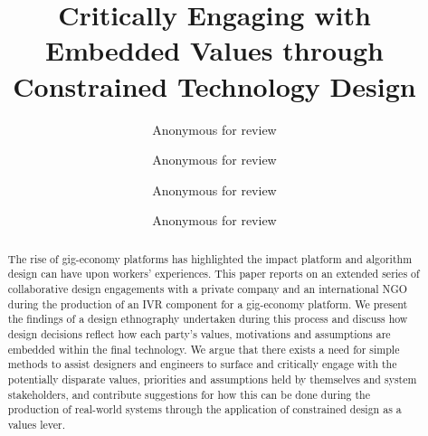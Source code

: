 \documentclass[sigconf,anonymous]{acmart}
\begin{document}
\title{Critically Engaging with Embedded Values through Constrained Technology Design}

\author{Anonymous for review}

\author{Anonymous for review}

\author{Anonymous for review}

\author{Anonymous for review}

\renewcommand{\shortauthors}{Anon et al.}

\begin{abstract}
The rise of gig-economy platforms has highlighted the impact platform and algorithm design can have upon workers’ experiences. This paper reports on an extended series of collaborative design engagements with a private company and an international NGO during the production of an IVR component for a gig-economy platform. We present the findings of a design ethnography undertaken during this process and discuss how design decisions reflect how each party’s values, motivations and assumptions are embedded within the final technology. We argue that there exists a need for simple methods to assist designers and engineers to surface and critically engage with the potentially disparate values, priorities and assumptions held by themselves and system stakeholders, and contribute suggestions for how this can be done during the production of real-world systems through the application of constrained design as a values lever.
\end{abstract}
\end{document}
